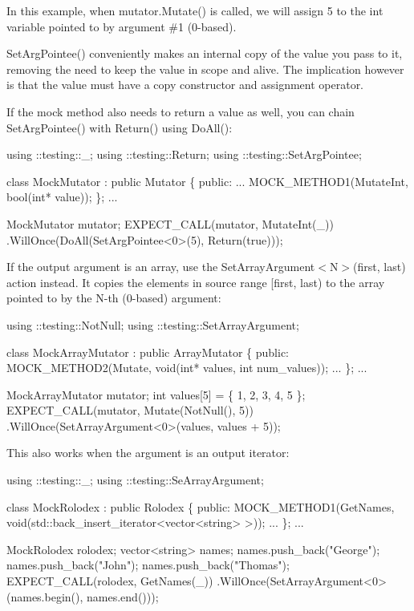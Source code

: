 In this example, when {\ttfamily mutator.\+Mutate()} is called, we will assign 5 to the {\ttfamily int} variable pointed to by argument \#1 (0-\/based).

{\ttfamily Set\+Arg\+Pointee()} conveniently makes an internal copy of the value you pass to it, removing the need to keep the value in scope and alive. The implication however is that the value must have a copy constructor and assignment operator.

If the mock method also needs to return a value as well, you can chain {\ttfamily Set\+Arg\+Pointee()} with {\ttfamily Return()} using {\ttfamily Do\+All()}\+:


\begin{DoxyCode}
using ::testing::\_;
using ::testing::Return;
using ::testing::SetArgPointee;

class MockMutator : public Mutator \{
 public:
  ...
  MOCK\_METHOD1(MutateInt, bool(int* value));
\};
...

  MockMutator mutator;
  EXPECT\_CALL(mutator, MutateInt(\_))
      .WillOnce(DoAll(SetArgPointee<0>(5),
                      Return(true)));
\end{DoxyCode}


If the output argument is an array, use the {\ttfamily Set\+Array\+Argument$<$N$>$(first, last)} action instead. It copies the elements in source range {\ttfamily \mbox{[}first, last)} to the array pointed to by the {\ttfamily N}-\/th (0-\/based) argument\+:


\begin{DoxyCode}
using ::testing::NotNull;
using ::testing::SetArrayArgument;

class MockArrayMutator : public ArrayMutator \{
 public:
  MOCK\_METHOD2(Mutate, void(int* values, int num\_values));
  ...
\};
...

  MockArrayMutator mutator;
  int values[5] = \{ 1, 2, 3, 4, 5 \};
  EXPECT\_CALL(mutator, Mutate(NotNull(), 5))
      .WillOnce(SetArrayArgument<0>(values, values + 5));
\end{DoxyCode}


This also works when the argument is an output iterator\+:


\begin{DoxyCode}
using ::testing::\_;
using ::testing::SeArrayArgument;

class MockRolodex : public Rolodex \{
 public:
  MOCK\_METHOD1(GetNames, void(std::back\_insert\_iterator<vector<string> >));
  ...
\};
...

  MockRolodex rolodex;
  vector<string> names;
  names.push\_back("George");
  names.push\_back("John");
  names.push\_back("Thomas");
  EXPECT\_CALL(rolodex, GetNames(\_))
      .WillOnce(SetArrayArgument<0>(names.begin(), names.end()));
\end{DoxyCode}


